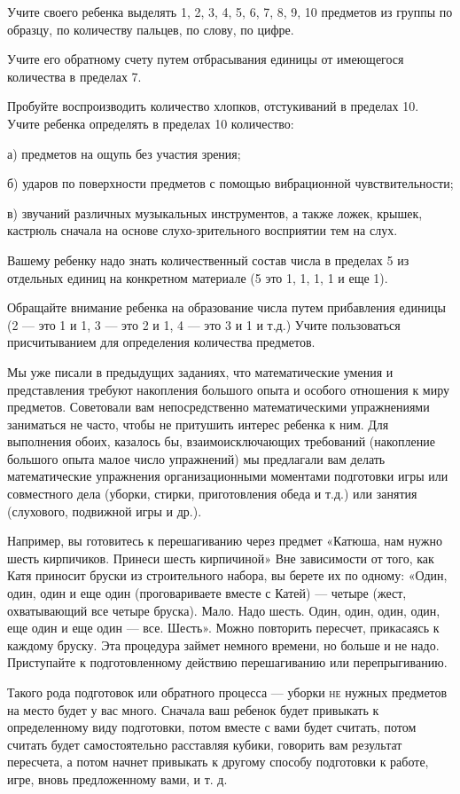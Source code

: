\documentclass{book}
\begin{document}
Учите своего ребенка выделять 1, 2, 3, 4, 5, 6, 7, 8, 9, 10 предметов из
группы по образцу, по количеству пальцев, по слову, по цифре.

Учите его обратному счету путем отбрасывания единицы от имеющегося
количества в пределах 7.

Пробуйте воспроизводить количество хлопков, отстукиваний в пределах 10.
Учите ребенка определять в пределах 10 количество:

а) предметов на ощупь без участия зрения;

б) ударов по поверхности предметов с помощью вибрационной
чувствительности;

в) звучаний различных музыкальных инструментов, а также ложек, крышек,
кастрюль сначала на основе слухо-зрительного восприятии тем на слух.

Вашему ребенку надо знать количественный состав числа в пределах 5 из
отдельных единиц на конкретном материале (5 это 1, 1, 1, 1 и еще 1).

Обращайте внимание ребенка на образование числа путем прибавления
единицы (2 --- это 1 и 1, 3 --- это 2 и 1, 4 --- это 3 и 1 и т.д.) Учите
пользоваться присчитыванием для определения количества предметов.

Мы уже писали в предыдущих заданиях, что математические умения и
представления требуют накопления большого опыта и особого отношения к
миру предметов. Советовали вам непосредственно математическими
упражнениями заниматься не часто, чтобы не притушить интерес ребенка к
ним. Для выполнения обоих, казалось бы, взаимоисключающих требований
(накопление большого опыта малое число упражнений) мы предлагали вам
делать математические упражнения организационными моментами подготовки
игры или совместного дела (уборки, стирки, приготовления обеда и т.д.)
или занятия (слухового, подвижной игры и др.).

Например, вы готовитесь к перешагиванию через предмет «Катюша, нам нужно
шесть кирпичиков. Принеси шесть кирпичиной» Вне зависимости от того, как
Катя приносит бруски из строительного набора, вы берете их по одному:
«Один, один, один и еще один (проговариваете вместе с Катей) --- четыре
(жест, охватывающий все четыре бруска). Мало. Надо шесть. Один, один,
один, один, еще один и еще один --- все. Шесть». Можно повторить
пересчет, прикасаясь к каждому бруску. Эта процедура займет немного
времени, но больше и не надо. Приступайте к подготовленному действию
перешагиванию или перепрыгиванию.

Такого рода подготовок или обратного процесса --- уборки \textsc{не}
нужных предметов на место будет у вас много. Сначала ваш ребенок будет
привыкать к определенному виду подготовки, потом вместе с вами будет
считать, потом считать будет самостоятельно расставляя кубики, говорить
вам результат пересчета, а потом начнет привыкать к другому способу
подготовки к работе, игре, вновь предложенному вами, и т. д.
\end{document}
